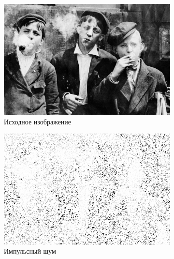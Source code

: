 \begin{figure}[ht!] 
    \centering
    \begin{subfigure}[b]{0.5\linewidth}
        \centering
        \includegraphics[width=0.95\linewidth]{../lewis-hine-taschen-main-3.jpg} 
        \caption{Исходное изображение} 
        \label{rang_5_25:a} 
        \vspace{4ex}
    \end{subfigure}%
    \begin{subfigure}[b]{0.5\linewidth}
      \centering
      \includegraphics[width=0.95\linewidth]{../Rang_Filter/Rang_Impulse_noise_(k=5,r=25).jpg} 
      \caption{Импульсный шум} 
      \label{rang_5_25:b} 
      \vspace{4ex}
    \end{subfigure}
    \begin{subfigure}[b]{0.5\linewidth}
      \centering

\end{subfigure}
\end{figure}
